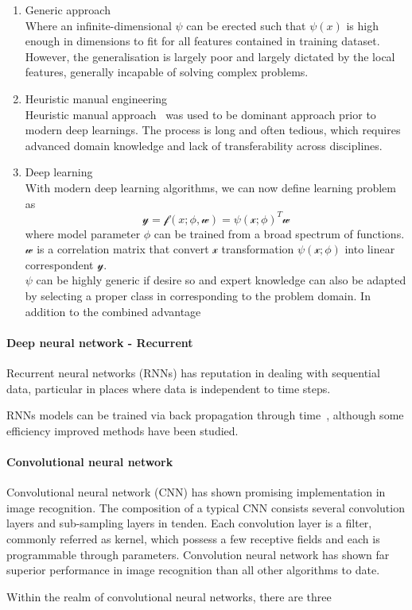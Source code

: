 \begin{enumerate}
    \item Generic approach \\
Where an infinite-dimensional $\psi$ can be erected such that $\psi(x)$ is high enough in dimensions to fit for all features contained in training dataset. However, the generalisation is largely poor and largely dictated by the local features, generally incapable of solving complex problems. 
    \item Heuristic manual engineering \\
Heuristic manual approach~\cite{Goodfellow-et-al-2016} was used to be dominant approach prior to modern deep learnings. The process is long and often tedious, which requires advanced domain knowledge and lack of transferability across disciplines.    
    \item Deep learning\\
With modern deep learning algorithms, we can now define learning problem as 
\begin{equation}
    \mathcal{y} = \mathcal{f}(x; \phi, \mathcal{w}) = \psi(\mathcal{x}; \phi)^T\mathcal{w}
\end{equation}
where model parameter $\phi$ can be trained from a broad spectrum of functions. $\mathcal{w}$ is a correlation matrix that convert $\mathcal{x}$ transformation $\psi(\mathcal{x}; \phi)$ into linear correspondent $\mathcal{y}$.  \\
$\psi$ can be highly generic if desire so and expert knowledge can also be adapted by selecting a proper class in corresponding to the problem domain. In addition to the combined advantage 
\end{enumerate}

\paragraph{Deep neural network - Recurrent}
Recurrent neural networks (RNNs) has reputation in dealing with sequential data, particular in places where data is independent to time steps. 

RNNs models can be trained via back propagation through time~\cite{Goodfellow-et-al-2016}, although some efficiency improved methods have been studied.~\cite{963769,neco.1989,Gomez:2008:ANE:1390681.1390712}

\paragraph{Convolutional neural network}
Convolutional neural network (CNN) has shown promising implementation in image recognition. The composition of a typical CNN consists several convolution layers and sub-sampling layers in tenden. Each convolution layer is a filter, commonly referred as kernel, which possess a few receptive fields and each is programmable through parameters.  
Convolution neural network has shown far superior performance in image recognition than all other algorithms to date.~\cite{Szegedy_2015}
\par 
Within the realm of convolutional neural networks, there are three